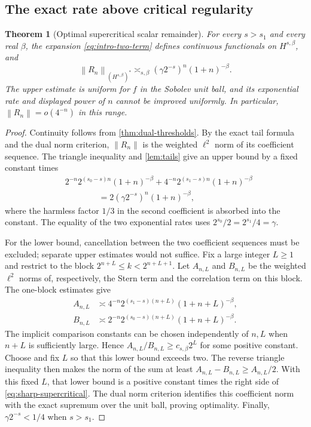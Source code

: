 \documentclass[11pt,a4paper]{article}
\newtheorem{theorem}{Theorem}[section]
\theoremstyle{definition}
\theoremstyle{remark}
\newcommand{\norm}[1]{\left\lVert#1\right\rVert}
\numberwithin{equation}{section}
\begin{document}
\subsection{The exact rate above critical regularity}
\begin{theorem}[Optimal supercritical scalar remainder]
\label{thm:supercritical-remainder}
For every $s>s_1$ and every real $\beta$, the expansion
\eqref{eq:intro-two-term} defines continuous functionals on $H^{s,\beta}$,
and
\begin{equation}
 \norm{R_n}_{(H^{s,\beta})^*}
 \asymp_{s,\beta}(\gamma2^{-s})^n(1+n)^{-\beta}.
 \label{eq:sharp-supercritical}
\end{equation}
The upper estimate is uniform for $f$ in the Sobolev unit ball, and its
exponential rate and displayed power of $n$ cannot be improved uniformly.
In particular, $\norm{R_n}=o(4^{-n})$ in this range.
\end{theorem}
\begin{proof}
Continuity follows from \cref{thm:dual-thresholds}. By the exact tail formula
and the dual norm criterion, $\norm{R_n}$ is the weighted $\ell^2$ norm of
its coefficient sequence. The triangle inequality and \cref{lem:tails}
give an upper bound by a fixed constant times
\begin{align*}
 &2^{-n}2^{(s_0-s)n}(1+n)^{-\beta}
  +4^{-n}2^{(s_1-s)n}(1+n)^{-\beta}\\
 &\hspace{4em}=2(\gamma2^{-s})^n(1+n)^{-\beta},
\end{align*}
where the harmless factor $1/3$ in the second coefficient is absorbed into
the constant. The equality of the two exponential rates uses
$2^{s_0}/2=2^{s_1}/4=\gamma$.

For the lower bound, cancellation between the two coefficient sequences
must be excluded; separate upper estimates would not suffice. Fix a large
integer $L\ge1$ and restrict to the block
$2^{n+L}\le k<2^{n+L+1}$. Let $A_{n,L}$ and $B_{n,L}$ be the weighted
$\ell^2$ norms of, respectively, the Stern term and the correlation term
on this block. The one-block estimates give
\begin{align*}
 A_{n,L}&\asymp 4^{-n}2^{(s_1-s)(n+L)}(1+n+L)^{-\beta},\\
 B_{n,L}&\asymp 2^{-n}2^{(s_0-s)(n+L)}(1+n+L)^{-\beta}.
\end{align*}
The implicit comparison constants can be chosen independently of $n,L$
when $n+L$ is sufficiently large. Hence
$A_{n,L}/B_{n,L}\ge c_{s,\beta}2^L$ for some positive constant.
Choose and fix $L$ so that this lower bound exceeds two. The reverse
triangle inequality then makes the norm of the sum at least
$A_{n,L}-B_{n,L}\ge A_{n,L}/2$. With this fixed $L$, that lower bound
is a positive constant times the right side of
\eqref{eq:sharp-supercritical}. The dual norm criterion identifies this
coefficient norm with the exact supremum over the unit ball, proving
optimality. Finally, $\gamma2^{-s}<1/4$ when $s>s_1$.
\end{proof}
\end{document}

